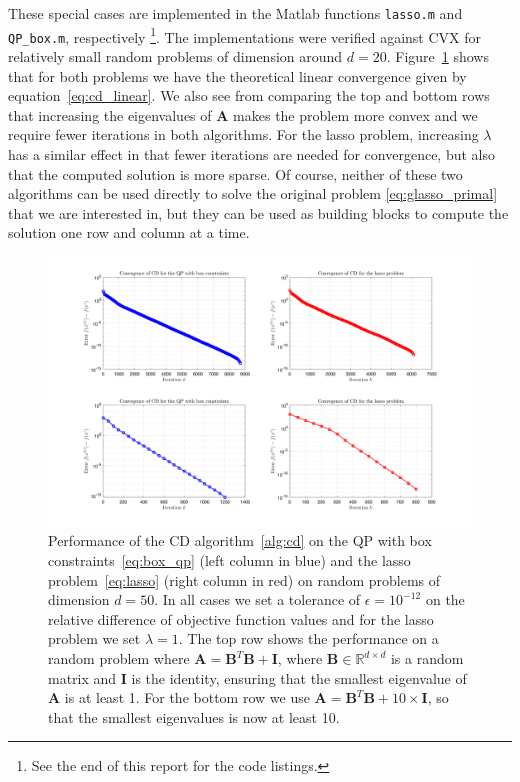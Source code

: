 \documentclass[10pt, letterpaper]{article}
\newcommand{\R}{\mathbb{R}} %
\begin{document}
These special cases are implemented in the Matlab functions \texttt{lasso.m} and \texttt{QP\_box.m}, respectively \footnote{See the end of this report for the code listings.}.  The implementations were verified against CVX for relatively small random problems of dimension around $d=20$.  Figure~\ref{fig:CD_convergence} shows that for both problems we have the theoretical linear convergence given by equation~\ref{eq:cd_linear}.  We also see from comparing the top and bottom rows that increasing the eigenvalues of ${\boldsymbol A}$ makes the problem more convex and we require fewer iterations in both algorithms.  For the lasso problem, increasing $\lambda$ has a similar effect in that fewer iterations are needed for convergence, but also that the computed solution is more sparse.  Of course, neither of these two algorithms can be used directly to solve the original problem \ref{eq:glasso_primal} that we are interested in, but they can be used as building blocks to compute the solution one row and column at a time.
 

\begin{figure}
\centering
\includegraphics[width=\textwidth]{plots/CD_convergence.png}
\caption{Performance of the CD algorithm~\ref{alg:cd} on the QP with box constraints~\ref{eq:box_qp} (left column in blue) and the lasso problem~\ref{eq:lasso} (right column in red) on random problems of dimension $d=50$.  In all cases we set a tolerance of $\epsilon = 10^{-12}$ on the relative difference of objective function values and for the lasso problem we set $\lambda = 1$.  The top row shows the performance on a random problem where ${\boldsymbol A} = {\boldsymbol B}^T {\boldsymbol B} + {\boldsymbol I}$, where ${\boldsymbol B} \in \R^{d\times d}$ is a random matrix and ${\boldsymbol I}$ is the identity, ensuring that the smallest eigenvalue of ${\boldsymbol A}$ is at least 1.  For the bottom row we use ${\boldsymbol A} = {\boldsymbol B}^T {\boldsymbol B} + 10\times {\boldsymbol I}$, so that the smallest eigenvalues is now at least 10.}
\label{fig:CD_convergence}
\end{figure}
\end{document}
